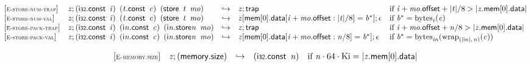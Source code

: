 $$
\begin{array}{@{}l@{}lcl@{}l@{}}
{[\textsc{\scriptsize E{-}store{-}num{-}trap}]} \quad & {\mathit{z}} ; (\mathsf{i{\scriptstyle32}}.\mathsf{const}~\,{\mathit{i}})~\,({\mathit{t}}.\mathsf{const}~\,{\mathit{c}})~\,(\mathsf{store}~\,{\mathit{t}}~\,{\mathit{mo}}) &\hookrightarrow& {\mathit{z}} ; \mathsf{trap} &\quad
  \mbox{if}~{\mathit{i}} + {\mathit{mo}}.\mathsf{offset} + {|{\mathit{t}}|} / 8 > {|{{\mathit{z}}.\mathsf{mem}}{{}[0]}.\mathsf{data}|} \\
{[\textsc{\scriptsize E{-}store{-}num{-}val}]} \quad & {\mathit{z}} ; (\mathsf{i{\scriptstyle32}}.\mathsf{const}~\,{\mathit{i}})~\,({\mathit{t}}.\mathsf{const}~\,{\mathit{c}})~\,(\mathsf{store}~\,{\mathit{t}}~\,{\mathit{mo}}) &\hookrightarrow& {\mathit{z}}{}[\mathsf{mem}{}[0].\mathsf{data}{}[{\mathit{i}} + {\mathit{mo}}.\mathsf{offset} : {|{\mathit{t}}|} / 8] = {{\mathit{b}}^\ast}] ; \epsilon &\quad
  \mbox{if}~{{\mathit{b}}^\ast} = {{\mathrm{bytes}}}_{{\mathit{t}}}({\mathit{c}}) \\
{[\textsc{\scriptsize E{-}store{-}pack{-}trap}]} \quad & {\mathit{z}} ; (\mathsf{i{\scriptstyle32}}.\mathsf{const}~\,{\mathit{i}})~\,({\mathsf{i}}{{\mathit{n}}}.\mathsf{const}~\,{\mathit{c}})~\,({{\mathsf{i}}{{\mathit{n}}}.\mathsf{store}}{{\mathit{n}}}~\,{\mathit{mo}}) &\hookrightarrow& {\mathit{z}} ; \mathsf{trap} &\quad
  \mbox{if}~{\mathit{i}} + {\mathit{mo}}.\mathsf{offset} + {\mathit{n}} / 8 > {|{{\mathit{z}}.\mathsf{mem}}{{}[0]}.\mathsf{data}|} \\
{[\textsc{\scriptsize E{-}store{-}pack{-}val}]} \quad & {\mathit{z}} ; (\mathsf{i{\scriptstyle32}}.\mathsf{const}~\,{\mathit{i}})~\,({\mathsf{i}}{{\mathit{n}}}.\mathsf{const}~\,{\mathit{c}})~\,({{\mathsf{i}}{{\mathit{n}}}.\mathsf{store}}{{\mathit{n}}}~\,{\mathit{mo}}) &\hookrightarrow& {\mathit{z}}{}[\mathsf{mem}{}[0].\mathsf{data}{}[{\mathit{i}} + {\mathit{mo}}.\mathsf{offset} : {\mathit{n}} / 8] = {{\mathit{b}}^\ast}] ; \epsilon &\quad
  \mbox{if}~{{\mathit{b}}^\ast} = {{\mathrm{bytes}}}_{{{\mathit{i}}}{{\mathit{n}}}}({{{\mathrm{wrap}}}_{({|{\mathsf{i}}{{\mathit{n}}}|},\, {\mathit{n}})}}{({\mathit{c}})}) \\
\end{array}
$$

\vspace{1ex}

$$
\begin{array}{@{}l@{}lcl@{}l@{}}
{[\textsc{\scriptsize E{-}memory.size}]} \quad & {\mathit{z}} ; (\mathsf{memory.size}) &\hookrightarrow& (\mathsf{i{\scriptstyle32}}.\mathsf{const}~\,{\mathit{n}}) &\quad
  \mbox{if}~{\mathit{n}} \cdot 64 \cdot {\mathrm{Ki}} = {|{{\mathit{z}}.\mathsf{mem}}{{}[0]}.\mathsf{data}|} \\
\end{array}
$$

